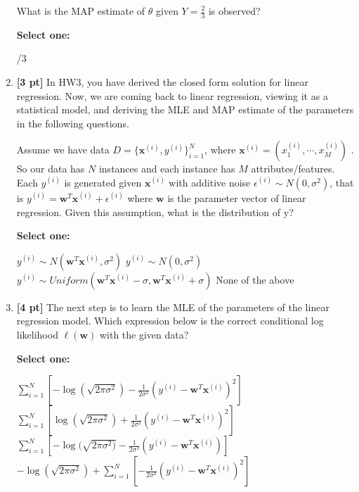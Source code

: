 \documentclass[12pt,addpoints,answers]{exam}
\begin{document}
\begin{enumerate}
    What is the MAP estimate of $\theta$ given $Y=\frac{2}{3}$ is observed?

    \textbf{Select one:}
    \begin{checkboxes}
        /3
    \end{checkboxes}
    
    
    \clearpage
    
    \item \textbf{[3 pt]} In HW3, you have derived the closed form solution for linear regression. Now, we are coming back to linear regression, viewing it as a statistical model, and deriving the MLE and MAP estimate of the parameters in the following questions. 
    
    Assume we have data $D = \{\mathbf{x}^{(i)}, y^{(i)}\}_{i=1}^{N}$, where $\mathbf{x}^{(i)} = (x_1^{(i)}, \cdots, x_M^{(i)})$ . So our data has $N$  instances and each instance has $M$  attributes/features. Each $y^{(i)}$ is generated given $\mathbf{x}^{(i)}$ with additive noise $\epsilon^{(i)} \sim N(0, \sigma^2)$, that is $y^{(i)} = \mathbf{w}^T \mathbf{x}^{(i)} + \epsilon^{(i)}$ where $\mathbf{w}$  is the parameter vector of linear regression. Given this assumption, what is the distribution of y? 

    \textbf{Select one:}
    \begin{checkboxes}
        \choice $y^{(i)} \sim N(\mathbf{w}^T \mathbf{x}^{(i)}, \sigma^2)$
        \choice $y^{(i)} \sim N(0, \sigma^2)$
        \choice $y^{(i)} \sim \textit{Uniform}(\mathbf{w}^T \mathbf{x}^{(i)} - \sigma,  \mathbf{w}^T \mathbf{x}^{(i)} + \sigma)$
        \choice None of the above
    \end{checkboxes}
    
    
    \item \textbf{[4 pt]} The next step is to learn the MLE of the parameters of the linear regression model. Which expression below is the correct conditional log likelihood $\ell(\mathbf{w})$ with the given data?

    \textbf{Select one:}
    \begin{checkboxes}
        \choice $\sum_{i=1}^{N} [-\log (\sqrt{2\pi\sigma^2}) - \frac{1}{2\sigma^2} (y^{(i)} - \mathbf{w}^T\mathbf{x}^{(i)})^2]$
        \choice $\sum_{i=1}^{N} [\log (\sqrt{2\pi\sigma^2}) + \frac{1}{2\sigma^2} (y^{(i)} - \mathbf{w}^T\mathbf{x}^{(i)})^2]$
        \choice $\sum_{i=1}^{N} [-\log(\sqrt{2\pi\sigma^2)} - \frac{1}{2\sigma^2} (y^{(i)} - \mathbf{w}^T\mathbf{x}^{(i)})]$
        \choice $-\log (\sqrt{2\pi\sigma^2}) + \sum_{i=1}^{N} [-\frac{1}{2\sigma^2} (y^{(i)} - \mathbf{w}^T\mathbf{x}^{(i)})^2]$
    \end{checkboxes}
    

\end{enumerate}
\end{document}
